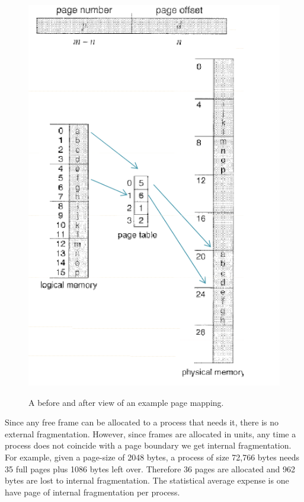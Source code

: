 \documentclass[10pt,a4paper]{article}
\begin{document}
\begin{figure}
\caption{A before and after view of an example page mapping. \cite{OSCONCEPTS}}
\begin{center}
\includegraphics[scale=0.45]{../images/page-mapping.png}
\label{page mapping}
\end{center}
\end{figure}
Since any free frame can be allocated to a process that needs it, there is no external fragmentation. However, since frames are allocated in units, any time a process does not coincide with a page boundary we get internal fragmentation. For example, given a page-size of 2048 bytes, a process of size 72,766 bytes needs 35 full pages plus 1086 bytes left over. Therefore 36 pages are allocated and 962 bytes are lost to internal fragmentation. The statistical average expense is one have page of internal fragmentation per process. 
\newline\newline
\end{document}
